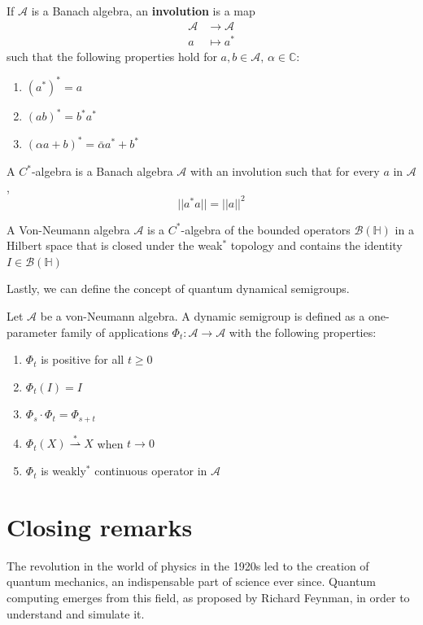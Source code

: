 If $\mathcal{A}$ is a Banach algebra, an \textbf{involution} is a map 
\begin{align}
    \mathcal{A} &\longrightarrow \mathcal{A} \\
    a &\longmapsto a^*
\end{align}
such that the following properties hold for $a,b \in \mathcal{A},\, \alpha \in \mathbb{C}$:
\begin{enumerate}
    \item $(a^*)^*=a$
    \item $(ab)^* = b^*a^*$
    \item $(\alpha a +b)^* = \bar{\alpha}a^* +b^*$
\end{enumerate}

\begin{definicion}[$C^*$-algebra]
    A $C^*$-algebra is a Banach algebra $\mathcal{A}$ with an involution such that for every $a$ in $\mathcal{A}$,
    $$ ||a^*a||=||a||^2$$
\end{definicion}

\begin{definicion}
    A Von-Neumann algebra $\mathcal{A}$ is a $C^*$-algebra of the bounded operators $\mathcal{B}(\mathbb{H})$ in a Hilbert space that is closed under the weak$^*$ topology and contains the identity $I \in \mathcal{B}(\mathbb{H})$
\end{definicion}
 
Lastly, we can define the concept of quantum dynamical semigroups.
\begin{definicion}
    Let $\mathcal{A}$ be a von-Neumann algebra. A dynamic semigroup is defined as a one-parameter family of applications $\Phi_t: \mathcal{A} \longrightarrow \mathcal{A}$ with the following properties:
    \begin{enumerate}
        \item $\Phi_t$ is positive for all $t\geq 0$
        \item $\Phi_t(I)=I$
        \item $\Phi_s \cdot \Phi_t = \Phi_{s+t}$
        \item $\Phi_t(X) \stackrel{*}{\rightharpoonup} X$ when $t \longrightarrow 0$
        \item $\Phi_t$ is weakly$^*$ continuous operator in $\mathcal{A}$
    \end{enumerate}
\end{definicion}

\section{Closing remarks}
The revolution in the world of physics in the 1920s led to the creation of quantum mechanics, an indispensable part of science ever since. Quantum computing emerges from this field, as proposed by Richard Feynman, in order to understand and simulate it.

